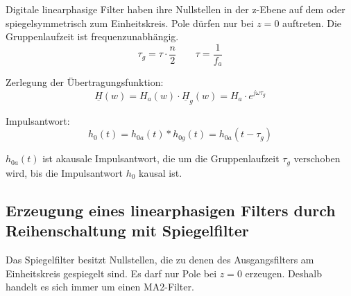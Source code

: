\documentclass[a4paper, 12pt]{report}
\begin{document}
		Digitale linearphasige Filter haben ihre Nullstellen in der z-Ebene auf dem oder spiegelsymmetrisch zum Einheitskreis. Pole dürfen nur bei $ z = 0 $ auftreten. Die Gruppenlaufzeit ist frequenzunabhängig.
		\[ \tau_g = \tau \cdot \frac{n}{2} \qquad \tau = \frac{1}{f_a} \]

		Zerlegung der Übertragungsfunktion:
		\[ \underline{H}(w) = H_a(w) \cdot \underline{H}_g(w) = H_a \cdot e^{j\omega\tau_g} \]
		
		Impulsantwort:
		\[ h_0(t) = h_{0a}(t) \ast h{_{0g}}(t) = h_{0a}(t-\tau_g) \]
		
		$ h_{0a}(t) $ ist akausale Impulsantwort, die um die Gruppenlaufzeit $ \tau_g $ verschoben wird, bis die Impulsantwort $ h_0 $ kausal ist.
		
		\subsection*{Erzeugung eines linearphasigen Filters durch Reihenschaltung mit Spiegelfilter}
			
			Das Spiegelfilter besitzt Nullstellen, die zu denen des Ausgangsfilters am Einheitskreis gespiegelt sind. Es darf nur Pole bei $ z = 0 $ erzeugen. Deshalb handelt es sich immer um einen MA2-Filter.
			
			\vspace{0.5cm}
		
\end{document}
